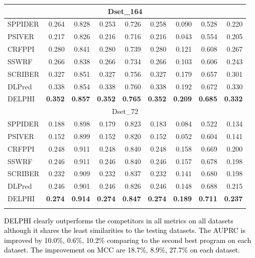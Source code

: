 \documentclass{bioinfo}
\newcommand{\myColor}{black}
\begin{document}
\begin{table}[H]
\begin{tabular}{@{}l@{\ }*{8}{r}}
    \hline
    \multicolumn{9}{c}{Dset\_164} \\
    \hline
    SPPIDER & 0.264 & 0.828 & 0.253 & 0.726 & 0.258 & 0.090 & 0.528 & 0.220 \\
    PSIVER & 0.217 & 0.826 & 0.216 & 0.716 & 0.216 & 0.043 & 0.554 & 0.205 \\
    CRFPPI & 0.280 & 0.841 & 0.280 & 0.739 & 0.280 & 0.121 & 0.608 & 0.267 \\
    SSWRF & 0.266 & 0.838 & 0.266 & 0.734 & 0.266 & 0.103 & 0.606 & 0.243 \\
    SCRIBER & 0.327 & 0.851 & 0.327 & 0.756 & 0.327 & 0.179 & 0.657 & 0.301 \\
    DLPred & 0.338 & 0.854 & 0.338 & 0.760 & 0.338 & 0.192 & 0.672 & 0.330 \\
    DELPHI & \textbf{0.352} & \textbf{0.857} & \textbf{0.352} & \textbf{0.765} & \textbf{0.352} & \textbf{0.209} & \textbf{0.685} & \textbf{0.332} \\
    \hline
    \multicolumn{9}{c}{Dset\_72} \\
    \hline
    SPPIDER & 0.188 & 0.898 & 0.179 & 0.823 & 0.183 & 0.084 & 0.522 & 0.134 \\
    PSIVER & 0.152 & 0.899 & 0.152 & 0.820 & 0.152 & 0.052 & 0.604 & 0.141 \\
    CRFPPI & 0.248 & 0.911 & 0.248 & 0.840 & 0.248 & 0.158 & 0.669 & 0.200 \\
    SSWRF & 0.246 & 0.911 & 0.246 & 0.840 & 0.246 & 0.157 & 0.678 & 0.198 \\
    SCRIBER & 0.232 & 0.909 & 0.232 & 0.837 & 0.232 & 0.141 & 0.680 & 0.198 \\
    DLPred & 0.246 & 0.901 & 0.246 & 0.826 & 0.246 & 0.148 & 0.688 & 0.215 \\
    DELPHI & \textbf{0.274} & \textbf{0.914} & \textbf{0.274} & \textbf{0.847} & \textbf{0.274} & \textbf{0.189} & \textbf{0.711} & \textbf{0.237} \\
    \hline
\label{tab_ds186_164_72}
    \end{tabular}%
\end{table}%




\textcolor{\myColor}{
DELPHI clearly outperforms the competitors in all metrics on all datasets although it shares the least similarities to the testing datasets.  The AUPRC is improved by 10.0\%, 0.6\%, 10.2\% comparing to the second best program on each dataset. The improvement on MCC are 18.7\%, 8.9\%, 27.7\% on each dataset. 
}
\end{document}
